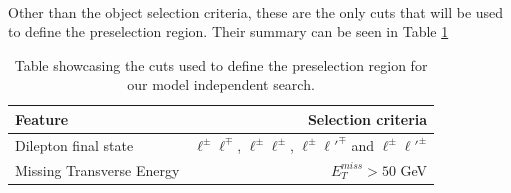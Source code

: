 \documentclass[12pt, a4paper]{book}
\begin{document}
\\Other than the object selection criteria, these are the only cuts that will be used to define the preselection region. Their summary can be seen in Table \ref{tab:CR_cuts}
\begin{table}[!h]
    \centering\caption[preselection region for model-independent search]{Table showcasing the cuts used to define the preselection region for our model independent search.}
    \begin{tabular}{l|r}\midrule\midrule
        Feature                                                                 & Selection criteria        \\\midrule
        Dilepton final state                                                    & $\ell^\pm \ell^\mp$, $\ell^\pm \ell^\pm$, $\ell^\pm \ell'^\mp$ and $\ell^\pm \ell'^\pm$    \\
        Missing Transverse Energy                                               & $E_T^{miss} > 50$ GeV     \\\midrule\midrule
    \end{tabular}
    \label{tab:CR_cuts}
\end{table}
\end{document}
